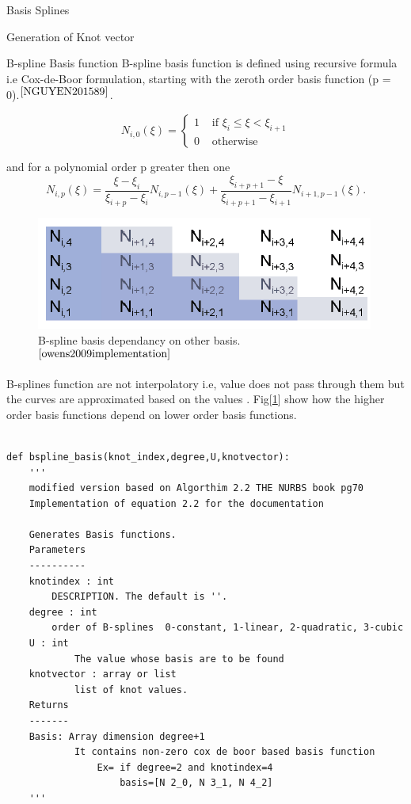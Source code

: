 \documentclass[a4paper,12pt,times]{article}
\begin{document}
\begin{section}{Basis Splines}
\begin{subsection}{Generation of Knot vector}
\end{subsection}
\begin{subsection}{B-spline Basis function}
B-spline basis function is defined using recursive formula i.e Cox-de-Boor formulation, starting with the zeroth order basis function (p = 0).$^{\cite{NGUYEN201589}}$. 


\begin{equation}\label{Cox-de-Boor formula zero basics}
N_{i, 0}(\xi)=\left\{\begin{array}{ll}
1 & \text { if } \xi_{i} \leq \xi<\xi_{i+1} \\
0 & \text { otherwise }
\end{array}\right.
\end{equation}

and for a polynomial order p greater then one
\begin{equation}\label{Cox-de-Boor formula higher order}
N_{i, p}(\xi)=\frac{\xi-\xi_{i}}{\xi_{i+p}-\xi_{i}} N_{i, p-1}(\xi)+\frac{\xi_{i+p+1}-\xi}{\xi_{i+p+1}-\xi_{i+1}} N_{i+1, p-1}(\xi) .
\end{equation}

\begin{figure}[h!]
\centering
\includegraphics[width=0.75\linewidth]{Bspline_basis_recussive.png}
\caption{B-spline basis dependancy on other basis.$^{\cite{owens2009implementation}}$}
\label{fig:B-spline basis dependancy on other basis}
\end{figure}


B-splines function are not interpolatory i.e, value does not pass through them but the curves are approximated based on the values . Fig[\ref{fig:B-spline basis dependancy on other basis}] show how the higher order basis functions depend on lower order basis functions.

 
\begin{lstlisting} 

def bspline_basis(knot_index,degree,U,knotvector):
    '''
    modified version based on Algorthim 2.2 THE NURBS book pg70
    Implementation of equation 2.2 for the documentation

    Generates Basis functions.
    Parameters
    ----------
    knotindex : int 
        DESCRIPTION. The default is ''.
    degree : int
        order of B-splines  0-constant, 1-linear, 2-quadratic, 3-cubic
    U : int
            The value whose basis are to be found
    knotvector : array or list
            list of knot values.
    Returns
    -------
    Basis: Array dimension degree+1   
            It contains non-zero cox de boor based basis function
                Ex= if degree=2 and knotindex=4 
                    basis=[N 2_0, N 3_1, N 4_2]
    '''
\end{lstlisting}

\end{subsection}
\end{section}
\end{document}
